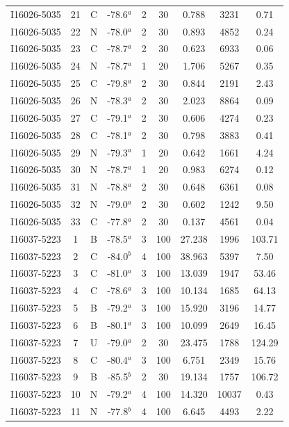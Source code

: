 \begin{table}
\begin{tabular}{ccccccccc}
I16026-5035 & 21 & C & -78.6$^{a}$ & 2 & 30 & 0.788 & 3231 & 0.71 \\
I16026-5035 & 22 & N & -78.0$^{a}$ & 2 & 30 & 0.893 & 4852 & 0.24 \\
I16026-5035 & 23 & C & -78.7$^{a}$ & 2 & 30 & 0.623 & 6933 & 0.06 \\
I16026-5035 & 24 & N & -78.7$^{a}$ & 1 & 20 & 1.706 & 5267 & 0.35 \\
I16026-5035 & 25 & C & -79.8$^{a}$ & 2 & 30 & 0.844 & 2191 & 2.43 \\
I16026-5035 & 26 & N & -78.3$^{a}$ & 2 & 30 & 2.023 & 8864 & 0.09 \\
I16026-5035 & 27 & C & -79.1$^{a}$ & 2 & 30 & 0.606 & 4274 & 0.23 \\
I16026-5035 & 28 & C & -78.1$^{a}$ & 2 & 30 & 0.798 & 3883 & 0.41 \\
I16026-5035 & 29 & N & -79.3$^{a}$ & 1 & 20 & 0.642 & 1661 & 4.24 \\
I16026-5035 & 30 & N & -78.7$^{a}$ & 1 & 20 & 0.983 & 6274 & 0.12 \\
I16026-5035 & 31 & N & -78.8$^{a}$ & 2 & 30 & 0.648 & 6361 & 0.08 \\
I16026-5035 & 32 & N & -79.0$^{a}$ & 2 & 30 & 0.602 & 1242 & 9.50 \\
I16026-5035 & 33 & C & -77.8$^{a}$ & 2 & 30 & 0.137 & 4561 & 0.04 \\
I16037-5223 & 1 & B & -78.5$^{a}$ & 3 & 100 & 27.238 & 1996 & 103.71 \\
I16037-5223 & 2 & C & -84.0$^{b}$ & 4 & 100 & 38.963 & 5397 & 7.50 \\
I16037-5223 & 3 & C & -81.0$^{a}$ & 3 & 100 & 13.039 & 1947 & 53.46 \\
I16037-5223 & 4 & C & -78.6$^{a}$ & 3 & 100 & 10.134 & 1685 & 64.13 \\
I16037-5223 & 5 & B & -79.2$^{a}$ & 3 & 100 & 15.920 & 3196 & 14.77 \\
I16037-5223 & 6 & B & -80.1$^{a}$ & 3 & 100 & 10.099 & 2649 & 16.45 \\
I16037-5223 & 7 & U & -79.0$^{a}$ & 2 & 30 & 23.475 & 1788 & 124.29 \\
I16037-5223 & 8 & C & -80.4$^{a}$ & 3 & 100 & 6.751 & 2349 & 15.76 \\
I16037-5223 & 9 & B & -85.5$^{b}$ & 2 & 30 & 19.134 & 1757 & 106.72 \\
I16037-5223 & 10 & N & -79.2$^{a}$ & 4 & 100 & 14.320 & 10037 & 0.43 \\
I16037-5223 & 11 & N & -77.8$^{b}$ & 4 & 100 & 6.645 & 4493 & 2.22 \\

\end{tabular}
\end{table}
